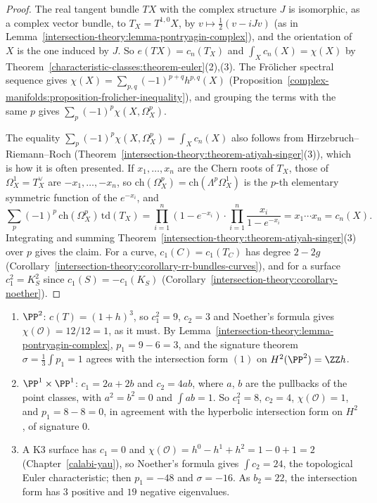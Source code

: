 \begin{proof}
The real tangent bundle $TX$ with the complex structure $J$ is isomorphic, as a complex vector bundle, to $T_X = T^{1,0}X$, by $v \mapsto \frac12(v - iJv)$ (as in Lemma~\ref{intersection-theory:lemma-pontryagin-complex}), and the
orientation of $X$ is the one induced by $J$. So $e(TX) = c_n(T_X)$ and $\int_Xc_n(X) = \chi(X)$ by Theorem~\ref{characteristic-classes:theorem-euler}(2),(3). The Fr\"olicher spectral sequence gives
$\chi(X) = \sum_{p,q}(-1)^{p+q}h^{p,q}(X)$ (Proposition~\ref{complex-manifolds:proposition-frolicher-inequality}), and grouping the terms with the same $p$ gives $\sum_p(-1)^p\chi(X, \Omega^p_X)$.

The equality $\sum_p(-1)^p\chi(X, \Omega^p_X) = \int_Xc_n(X)$ also follows from Hirzebruch--Riemann--Roch (Theorem~\ref{intersection-theory:theorem-atiyah-singer}(3)), which is how it is often presented. If $x_1, \ldots, x_n$ are the Chern roots of
$T_X$, those of $\Omega^1_X = T_X^\vee$ are $-x_1, \ldots, -x_n$, so $\mathrm{ch}(\Omega^p_X) = \mathrm{ch}(\Lambda^p\Omega^1_X)$ is the $p$-th elementary symmetric function of the $e^{-x_i}$, and
\[
\sum_p(-1)^p\,\mathrm{ch}(\Omega^p_X)\,\mathrm{td}(T_X) = \prod_{i=1}^n(1 - e^{-x_i}) \cdot \prod_{i=1}^n\frac{x_i}{1 - e^{-x_i}} = x_1 \cdots x_n = c_n(X).
\]
Integrating and summing Theorem~\ref{intersection-theory:theorem-atiyah-singer}(3) over $p$ gives the claim. For a curve, $c_1(C) = c_1(T_C)$ has degree $2 - 2g$ (Corollary~\ref{intersection-theory:corollary-rr-bundles-curves}), and for
a surface $c_1^2 = K_S^2$ since $c_1(S) = -c_1(K_S)$ (Corollary~\ref{intersection-theory:corollary-noether}).
\end{proof}

\begin{example}\label{intersection-theory:example-surfaces}
\begin{enumerate}
\item $\PP^2$: $c(T) = (1 + h)^3$, so $c_1^2 = 9$, $c_2 = 3$ and Noether's formula gives $\chi(\mathcal{O}) = 12/12 = 1$, as it must. By Lemma~\ref{intersection-theory:lemma-pontryagin-complex}, $p_1 = 9 - 6 = 3$, and the signature theorem
$\sigma = \frac13\int p_1 = 1$ agrees with the intersection form $(1)$ on $H^2(\PP^2) = \ZZ h$.
\item $\PP^1 \times \PP^1$: $c_1 = 2a + 2b$ and $c_2 = 4ab$, where $a$, $b$ are the pullbacks of the point classes, with $a^2 = b^2 = 0$ and $\int ab = 1$. So $c_1^2 = 8$, $c_2 = 4$, $\chi(\mathcal{O}) = 1$, and $p_1 = 8 - 8 = 0$, in agreement with the
hyperbolic intersection form on $H^2$, of signature $0$.
\item A K3 surface has $c_1 = 0$ and $\chi(\mathcal{O}) = h^0 - h^1 + h^2 = 1 - 0 + 1 = 2$ (Chapter~\ref{calabi-yau}), so Noether's formula gives $\int c_2 = 24$, the topological Euler characteristic; then $p_1 = -48$ and
$\sigma = -16$. As $b_2 = 22$, the intersection form has $3$ positive and $19$ negative eigenvalues.
\end{enumerate}
\end{example}

